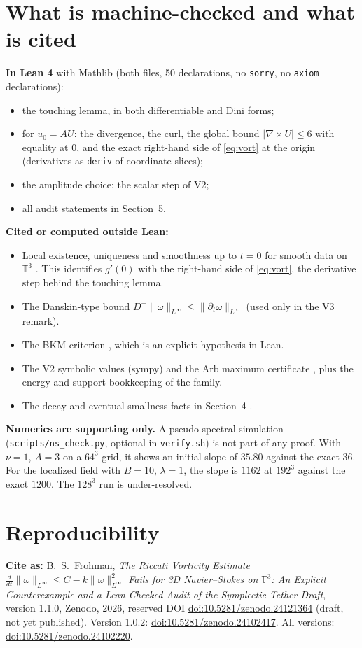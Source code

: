 \documentclass[11pt]{article}
\newcommand{\T}{\mathbb{T}^3}
\theoremstyle{remark}
\begin{document}
\section{What is machine-checked and what is cited}
\textbf{In Lean 4} \cite{Lean4} with Mathlib \cite{Mathlib} (both files, 50 declarations, no \texttt{sorry}, no \texttt{axiom} declarations):
\begin{itemize}
\item the touching lemma, in both differentiable and Dini forms;
\item for $u_0=AU$: the divergence, the curl, the global bound $|\nabla\times U|\le6$ with equality at $0$, and the
exact right-hand side of \eqref{eq:vort} at the origin (derivatives as \texttt{deriv} of coordinate slices);
\item the amplitude choice; the scalar step of V2;
\item all audit statements in Section~5.
\end{itemize}
\textbf{Cited or computed outside Lean:}
\begin{itemize}
\item Local existence, uniqueness and smoothness up to $t=0$ for smooth data on $\T$ \cite{Kato1972,RRS2016}. This
identifies $g'(0)$ with the right-hand side of \eqref{eq:vort}, the derivative step behind the touching lemma.
\item The Danskin-type bound $D^+\|\omega\|_{L^\infty}\le\|\partial_t\omega\|_{L^\infty}$ (used only in the V3 remark).
\item The BKM criterion \cite{BKM1984}, which is an explicit hypothesis in Lean.
\item The V2 symbolic values (sympy) and the Arb maximum certificate \cite{Arb2017}, plus the energy and support bookkeeping
of the family.
\item The decay and eventual-smallness facts in Section~4 \cite{RRS2016,FoiasTemam1989}.
\end{itemize}
\textbf{Numerics are supporting only.} A pseudo-spectral simulation (\texttt{scripts/ns\_check.py}, optional in
\texttt{verify.sh}) is not part of any proof. With $\nu=1$, $A=3$ on a $64^3$ grid, it shows an initial slope of
$35.80$ against the exact $36$. For the localized field with $B=10$, $\lambda=1$, the slope is $1162$ at $192^3$
against the exact $1200$. The $128^3$ run is under-resolved.

\section{Reproducibility}
\textbf{Cite as:} B.~S.~Frohman, \emph{The Riccati Vorticity Estimate $\frac{d}{dt}\|\omega\|_{L^\infty}\le C-k\|\omega\|_{L^\infty}^2$ Fails for 3D Navier--Stokes on $\mathbb{T}^3$: An Explicit Counterexample and a Lean-Checked Audit of the Symplectic-Tether Draft}, version 1.1.0, Zenodo, 2026, reserved DOI \href{https://doi.org/10.5281/zenodo.24121364}{doi:10.5281/zenodo.24121364} (draft, not yet published). Version 1.0.2: \href{https://doi.org/10.5281/zenodo.24102417}{doi:10.5281/zenodo.24102417}. All versions: \href{https://doi.org/10.5281/zenodo.24102220}{doi:10.5281/zenodo.24102220}.
\end{document}
